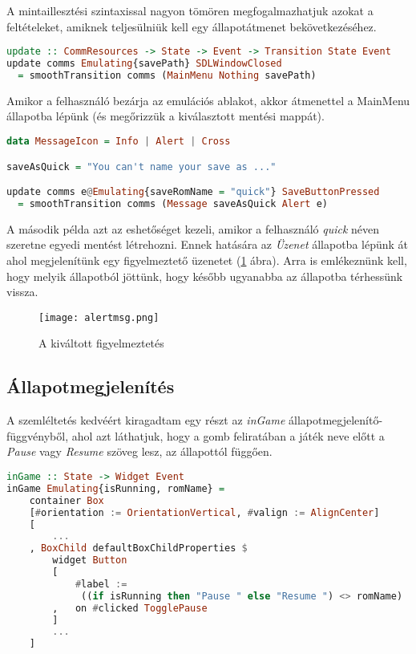 A mintaillesztési szintaxissal nagyon tömören megfogalmazhatjuk azokat a feltételeket, amiknek teljesülniük kell egy állapotátmenet bekövetkezéséhez.
\vspace{0.2cm}
\begin{lstlisting}[language=Haskell, basicstyle=\scriptsize]
update :: CommResources -> State -> Event -> Transition State Event
update comms Emulating{savePath} SDLWindowClosed 
  = smoothTransition comms (MainMenu Nothing savePath)
\end{lstlisting}
\vspace{0.2cm}
Amikor a felhasználó bezárja az emulációs ablakot, akkor átmenettel a MainMenu állapotba lépünk (és megőrizzük a kiválasztott mentési mappát). 
\vspace{0.2cm}
\begin{lstlisting}[language=Haskell, basicstyle=\scriptsize]
data MessageIcon = Info | Alert | Cross

saveAsQuick = "You can't name your save as ..."

update comms e@Emulating{saveRomName = "quick"} SaveButtonPressed 
  = smoothTransition comms (Message saveAsQuick Alert e)
\end{lstlisting}

A második példa azt az eshetőséget kezeli, amikor a felhasználó \emph{quick} néven szeretne egyedi mentést létrehozni. Ennek hatására az \emph{Üzenet} állapotba lépünk át ahol megjelenítünk egy figyelmeztető üzenetet (\ref{fig:warning} ábra). Arra is emlékeznünk kell, hogy melyik állapotból jöttünk, hogy később ugyanabba az állapotba térhessünk vissza. 

\begin{figure}[H]
	\centering
	\texttt{[image: alertmsg.png]}
	\caption{A kiváltott figyelmeztetés\protect\footnotemark}
	\label{fig:warning}
\end{figure}

\subsection{Állapotmegjelenítés}

A szemléltetés kedvéért kiragadtam egy részt az \emph{inGame} állapotmegjelenítő-függvényből, ahol azt láthatjuk, hogy a gomb feliratában a játék neve előtt a \emph{Pause} vagy \emph{Resume} szöveg lesz, az állapottól függően.
\vspace{0.2cm}
\begin{lstlisting}[language=Haskell, basicstyle=\scriptsize]
inGame :: State -> Widget Event
inGame Emulating{isRunning, romName} = 
	container Box
	[#orientation := OrientationVertical, #valign := AlignCenter]
	[
		...
	, BoxChild defaultBoxChildProperties $ 
		widget Button
		[ 
			#label :=
			 ((if isRunning then "Pause " else "Resume ") <> romName)
		,	on #clicked TogglePause
		]
		...
	]
	
\end{lstlisting}

